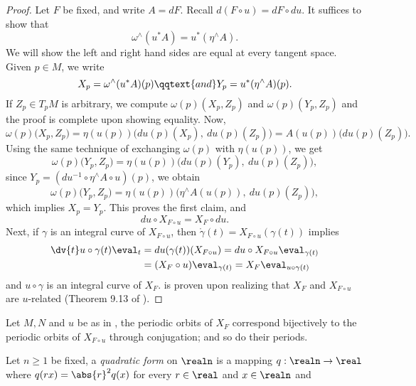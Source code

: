 \documentclass[../main-v2-manifolds.tex]{subfiles}
\begin{document}
\begin{proof}
    Let $F$ be fixed, and write $A = dF$. Recall $d(F\circ u) = dF\circ du$. It suffices to show that
    \begin{equation}
        \omega^{\wedge}(u^* A) = u^*(\eta^{\wedge} A).
        \label{eq:reduction 2 eq3}
    \end{equation}
    We will show the left and right hand sides are equal at every tangent space. Given $p\in M$, we write
    \[X_p = \omega^{\wedge}(u^* A)(p) \qqtext{and} Y_p = u^*(\eta^{\wedge} A)(p).\]
    If $Z_p\in T_pM$ is arbitrary, we compute $\omega(p)(X_p, Z_p)$ and $\omega(p)(Y_p, Z_p)$ and the proof is complete upon showing equality. Now,
    \[\omega(p)\biggl(X_p, Z_p\biggr) = \eta(u(p))\biggl(du(p)(X_p),\: du(p)(Z_p)\biggr)= A(u(p))\biggl(du(p)(Z_p)\biggr).\]
    Using the same technique of exchanging $\omega(p)$ with $\eta(u(p))$, we get
    \[
        \omega(p)\biggl(Y_p, Z_p\biggr) = \eta(u(p))\biggl(du(p)(Y_p),\: du(p)(Z_p)\biggr),
    \]
    since $Y_p = (du^{-1}\circ \eta^{\wedge}A \circ u)(p)$, we obtain
    \[
        \omega(p)\biggl(Y_p, Z_p\biggr) = \eta(u(p))\biggl(\eta^{\wedge}A(u(p)),\: du(p)(Z_p)\biggr),
    \]
    which implies $X_p = Y_p$. This proves the first claim, and 
    \[
        du\circ X_{F\circ u} = X_F\circ du.
    \]
    Next, if $\gamma$ is an integral curve of $X_{F\circ u}$, then $\mathring{\gamma}(t) = X_{F\circ u}(\gamma(t))$ implies
    \begin{align*}
        \dv{t}u\circ \gamma(t)\eval_t &= du(\gamma(t))(X_{F\circ u}) = du\circ X_{F\circ u}\eval_{\gamma(t)} \\
        &= (X_F\circ u)\eval_{\gamma(t)} = X_F\eval_{u\circ \gamma(t)}
    \end{align*}
    and $u\circ \gamma$ is an integral curve of $X_F$.  is proven upon realizing that $X_F$ and $X_{F\circ u}$ are $u$-related (Theorem 9.13 of \cite{Lee2013Introduction}).
\end{proof}
\begin{corollary}\label{cor:wc reduction 2.5}
    Let $M,N$ and $u$ be as in , the periodic orbits of $X_F$ correspond bijectively to the periodic orbits of $X_{F\circ u}$ through conjugation; and so do their periods.
\end{corollary}
Let $n\geq 1$ be fixed, a \emph{quadratic form} on $\realn$ is a mapping $q:\realn\to\real$ where $q(rx) = \abs{r}^2q(x)$ for every $r\in\real$ and $x\in \realn$ and
\end{document}
